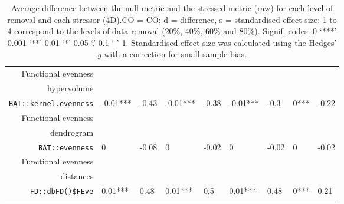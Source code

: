 \begin{table}[ht]
\begin{tabular}{rllllllll}
  Functional evenness\\ hypervolume\\ \texttt{BAT::kernel.evenness} & -0.01*** & -0.43 & -0.01*** & -0.38 & -0.01*** & -0.3 & 0*** & -0.22 \\ 
  Functional evenness\\ dendrogram\\ \texttt{BAT::evenness} & 0 & -0.08 & 0 & -0.02 & 0 & -0.02 & 0 & -0.02 \\ 
  Functional evenness\\ distances\\ \texttt{FD::dbFD()\$FEve} & 0.01*** & 0.48 & 0.01*** & 0.5 & 0.01*** & 0.48 & 0*** & 0.21 \\ 
   \hline
\end{tabular}
\caption{Average difference between the null metric and the stressed metric (raw) for each level of removal and each stressor (4D).CO = CO; d = difference, s = standardised effect size; 1 to 4 correspond to the levels of data removal (20\%, 40\%, 60\% and 80\%). Signif. codes:  0 ‘***’ 0.001 ‘**’ 0.01 ‘*’ 0.05 ‘.’ 0.1 ‘ ’ 1. Standardised effect size was calculated using the Hedges' \textit{g} with a correction for small-sample bias.} 
\end{table}
